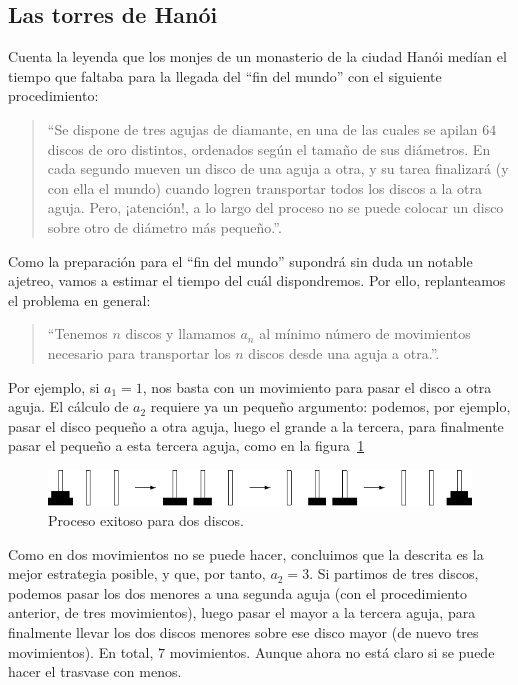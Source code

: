 \subsection{Las torres de Hanói}

Cuenta la leyenda que los monjes de un monasterio de la ciudad Hanói medían el tiempo que faltaba para la llegada del ``fin del mundo'' con el siguiente procedimiento:
\begin{quote}
	``Se dispone de tres agujas de diamante, en una de las cuales se apilan $64$ discos de oro distintos, ordenados según el tamaño de sus diámetros. En cada segundo mueven un disco de una aguja a otra, y su tarea finalizará (y con ella el mundo) cuando logren transportar todos los discos a la otra aguja. Pero, ¡atención!, a lo largo del proceso no se puede colocar un disco sobre otro de diámetro más pequeño.''.
\end{quote}
Como la preparación para el ``fin del mundo'' supondrá sin duda un notable ajetreo, vamos a estimar el tiempo del cuál dispondremos. Por ello, replanteamos el problema en general:
\begin{quote}
	``Tenemos $n$ discos y llamamos $a_n$ al mínimo número de movimientos necesario para transportar los $n$ discos desde una aguja a otra.''.
\end{quote}
Por ejemplo, si $a_{1}=1$, nos basta con un movimiento para pasar el disco a otra aguja. El cálculo de $a_2$ requiere ya un pequeño argumento: podemos, por ejemplo, pasar el disco pequeño a otra aguja, luego el grande a la tercera, para finalmente pasar el pequeño a esta tercera aguja, como en la figura~\ref{fig:hanoi}
\begin{figure}[ht!]
	\sidecaption[t]%
	\centering
	\includegraphics[width=0.4\paperwidth]{./img/hanoi}
	\caption{\label{fig:hanoi} Proceso exitoso para dos discos.}
\end{figure}
Como en dos movimientos no se puede hacer, concluimos que la descrita es la mejor estrategia posible, y que, por tanto, $a_{2}= 3$. Si partimos de tres discos, podemos pasar los dos menores a una segunda aguja (con el procedimiento anterior, de tres movimientos), luego pasar el mayor a la tercera aguja, para finalmente llevar los dos discos menores sobre ese disco mayor (de nuevo tres movimientos). En total, $7$ movimientos. Aunque ahora no está claro si se puede hacer el trasvase con menos.

